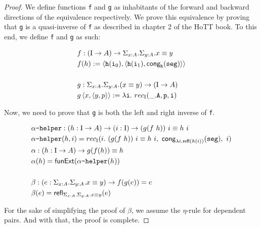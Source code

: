 \documentclass[12pt,twoside,maitrise]{dms}
\theoremstyle{definition}
\numberwithin{equation}{section}
\numberwithin{table}{chapter}
\numberwithin{figure}{chapter}
\newcommand\kw[1] {\textsf{#1}}
\newcommand\id[1] {\texttt{#1}}
\newcommand\fn[1] {\texttt{#1}}
\begin{document}
\begin{proof}
We define functions \id{f} and \id{g} as inhabitants of the forward and backward
directions of the equivalence respectively. We prove this equivalence by proving
that \fn{g} is a quasi-inverse of \fn{f} as described in chapter 2 of the HoTT
book\cite{HoTTbook}. To this end, we define \id{f} and \id{g} as such:


\begin{align*}
  & f : (\bI \rightarrow A) \rightarrow \Sigma_{\oftype{x}{A}} . \Sigma_{\oftype{y}{A}} . \eqtype{x}{y} \\
  & f(h) := \braket{\id{h}(\ileft), \braket{\id{h}(\iright), \kw{cong}_{\id{h}}(\id{seg})}} \\ \\
  & g : \Sigma_{\oftype{x}{A}} . \Sigma_{\oftype{y}{A}} . (\eqtype{x}{y}) \rightarrow  (\bI \rightarrow A) \\
  & g \braket{x, \braket{y, p}} := \lambda \id{i} . \ rec_{\bI}(\_ . \id{A}, \id{p}, \id{i})
\end{align*}

Now, we need to prove that \id{g} is both the left and right inverse of \id{f}.

\begin{align*}
  & \id{$\alpha$-helper} : (\oftype{h}{\bI \rightarrow A}) \rightarrow (\oftype{i}{\bI}) \rightarrow \eqtype{(g (f \ h)) \ i}{h \ i} \\
  & \id{$\alpha$-helper} (h , i) = rec_{\bI}(i . \ \eqtype{(g (f \ h)) \ i}{h \ i}, \ \kw{cong}_{\lambda i . \refl{h(i)}}(\id{seg}), \ i) \\
  & \alpha : (\oftype{h}{\bI \rightarrow A}) \rightarrow \eqtype{g(f(h))}{h} \\
  & \alpha(h) =  \kw{funExt} (\id{$\alpha$-helper} (h)) \\ \\
  & \beta :  (\oftype{e}{\Sigma_{\oftype{x}{A}} . \Sigma_{\oftype{y}{A}} . \eqtype{x}{y}}) \rightarrow f(g(e)) = e \\
  & \beta(e) =  \refl{\Sigma_{\oftype{x}{A}} . \Sigma_{\oftype{y}{A}} . \eqtype{x}{y}}{e}
\end{align*}

For the sake of simplifying the proof of $\beta$, we assume the $\eta$-rule for
dependent pairs. And with that, the proof is complete.

\end{proof}
\end{document}
